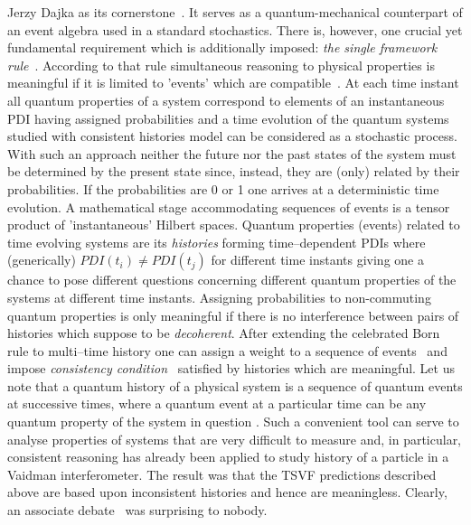 \begin{artengenv}{Jerzy Dajka}
as its cornerstone~\parencite{Griffiths}. It   serves as a quantum-mechanical counterpart of an event algebra used in a standard stochastics. There is, however, one  crucial yet fundamental requirement which is additionally imposed: {\it the single framework rule}~\parencite{Griffiths,Griffiths_reason,GRIFFITHS_measur}. According to that rule  simultaneous reasoning to physical properties is meaningful if it is limited to  'events'  which are compatible~\parencite{Griffiths,Griffiths_reason,GRIFFITHS_measur,GRIFFITHS_onto}. 
At each time instant all  quantum properties of a system correspond to elements of an instantaneous PDI having assigned probabilities and a  time  evolution  of the quantum systems studied with consistent histories model can be considered as a stochastic process. With such an approach neither 
the future nor the past states of the system must be 
determined by the present state since,  instead, they are (only) related by their probabilities. If the probabilities are 0 or 1 one arrives at a deterministic time evolution. A mathematical stage accommodating  sequences of events is a tensor product of 'instantaneous' Hilbert spaces. 
%
Quantum properties (events) related to time evolving systems are its {\it histories} forming time--dependent PDIs 
where (generically) $PDI(t_i)\neq PDI(t_j)$ for different time instants giving one a chance to pose different questions concerning different quantum properties of the systems at different time instants. 
Assigning probabilities to non-commuting quantum properties  is only meaningful if there is
no interference between pairs of histories which suppose to be {\it decoherent}. 
After extending the celebrated Born rule to multi--time history  one can assign a weight to a sequence of events~\parencite{Griffiths1984,Griffiths,Griffiths_reason,GRIFFITHS_onto, GRIFFITHS_measur} and impose  {\it consistency condition}~\parencite{Griffiths1984,Griffiths,Griffiths_reason,GRIFFITHS_onto, GRIFFITHS_measur} satisfied by histories which are meaningful.
Let us note that a quantum history of a physical system is a sequence of quantum events at successive times, where a quantum event at a particular time can be any quantum property of the system in question \parencite{Griffiths}. Such a  convenient tool can  serve to analyse properties of systems that are very difficult to measure and, in particular, consistent reasoning has already been applied to study history of a particle in a  Vaidman interferometer. The result was that the TSVF predictions described above are based upon inconsistent histories and hence are meaningless.  Clearly, an associate debate~\parencite{PhysRevA.94.032115,PhysRevA.95.066101} was surprising to nobody.

\end{artengenv}
